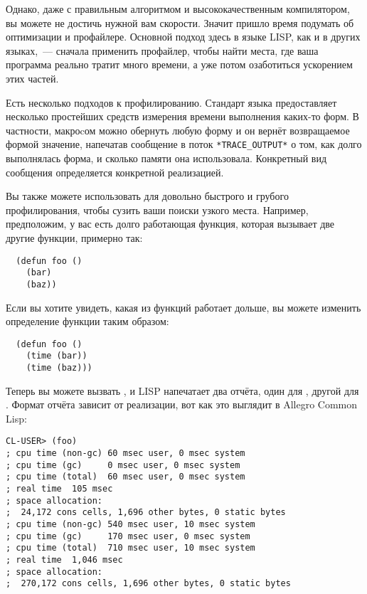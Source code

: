 Однако, даже с правильным алгоритмом и высококачественным компилятором, вы можете не
достичь нужной вам скорости. Значит пришло время подумать об оптимизации и
профайлере. Основной подход здесь в языке LISP, как и в других языках,~--- сначала
применить профайлер, чтобы найти места, где ваша программа реально тратит много времени, а
уже потом озаботиться ускорением этих частей.

Есть несколько подходов к профилированию. Стандарт языка предоставляет несколько
простейших средств измерения времени выполнения каких-то форм. В частности, макроcом
 можно обернуть любую форму и он вернёт возвращаемое формой значение, напечатав
сообщение в поток \lstinline!*TRACE_OUTPUT*! о том, как долго выполнялась форма, и сколько
памяти она использовала. Конкретный вид сообщения определяется конкретной реализацией.

Вы также можете использовать  для довольно быстрого и грубого профилирования,
чтобы сузить ваши поиски узкого места. Например, предположим, у вас есть долго работающая
функция, которая вызывает две другие функции, примерно так:

\begin{lstlisting}
  (defun foo ()
    (bar)
    (baz))
\end{lstlisting}

Если вы хотите увидеть, какая из функций работает дольше, вы можете изменить определение функции таким образом:

\begin{lstlisting}
  (defun foo ()
    (time (bar))
    (time (baz)))
\end{lstlisting}

Теперь вы можете вызвать , и LISP напечатает два отчёта, один для ,
другой для . Формат отчёта зависит от реализации, вот как это выглядит в Allegro
Common Lisp:

\begin{lstlisting}
CL-USER> (foo)
; cpu time (non-gc) 60 msec user, 0 msec system
; cpu time (gc)     0 msec user, 0 msec system
; cpu time (total)  60 msec user, 0 msec system
; real time  105 msec
; space allocation:
;  24,172 cons cells, 1,696 other bytes, 0 static bytes
; cpu time (non-gc) 540 msec user, 10 msec system
; cpu time (gc)     170 msec user, 0 msec system
; cpu time (total)  710 msec user, 10 msec system
; real time  1,046 msec
; space allocation:
;  270,172 cons cells, 1,696 other bytes, 0 static bytes
\end{lstlisting}

